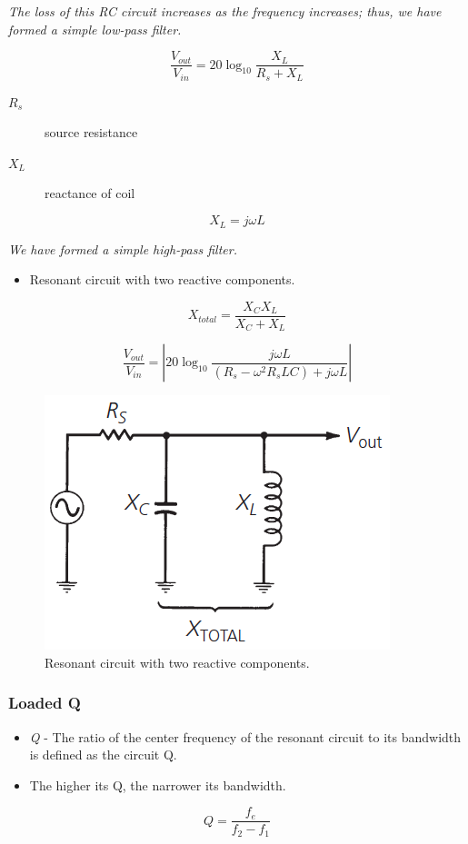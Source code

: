 \noindent\textit{The loss of this RC circuit	increases as the frequency increases; thus, we have formed a simple low-pass filter.}

\begin{equation}
\dfrac{V_{out}}{V_{in}} = 20\log_{10}\dfrac{X_L}{R_s+X_L}
\end{equation}

\begin{description}
	\item[$R_s$] source resistance
	\item[$X_L$] reactance of coil
\end{description}

\begin{equation}
X_L=j\omega L
\end{equation}

\noindent\textit{We have formed a simple high-pass filter.}

\begin{itemize}
	\item Resonant circuit with two reactive components.
\end{itemize}
\begin{equation}
X_{total}=\dfrac{X_C X_L}{X_C + X_L}
\end{equation}

\begin{equation}
\dfrac{V_{out}}{V_{in}} = \left|20\log_{10}\dfrac{j\omega L}{(R_s-\omega^2 R_s L C)+j\omega L}\right|
\end{equation}

\begin{figure} [H]
	\centering
	\includegraphics[width=0.5\linewidth]{graphics/22.png}
	\caption{Resonant circuit with two reactive components.}
	\label{fig:22}
\end{figure}

\subsubsection{Loaded Q}
\begin{itemize}
	\item \textit{Q} - The ratio of the center frequency of the resonant
	circuit to its bandwidth is defined as the circuit Q.
	\item The higher its Q, the narrower its bandwidth.
\end{itemize}
\begin{equation}
Q = \dfrac{f_e}{f_2-f_1}
\end{equation}

